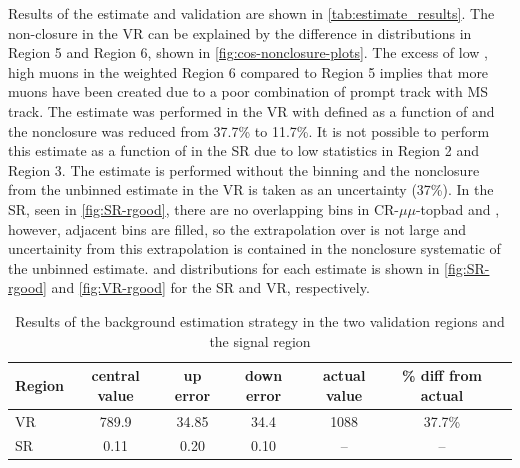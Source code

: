 Results of the estimate and validation are shown in \autoref{tab:estimate_results}. The non-closure in the VR can be explained by the difference in \absdz distributions in Region 5 and Region 6, shown in \autoref{fig:cos-nonclosure-plots}. The excess of low \absdz, high \chiCB muons in the weighted Region 6 compared to Region 5 implies that more muons have been created due to a poor combination of prompt track with MS track. The estimate was performed in the VR with \rgood  defined as a function of \absdz and the nonclosure was reduced from 37.7\% to 11.7\%. It is not possible to perform this estimate as a function of \absdz in the SR due to low statistics in Region 2 and Region 3. The estimate is performed without the \absdz binning and the nonclosure from the unbinned estimate in the VR is taken as an uncertainty (37\%). In the SR, seen in \autoref{fig:SR-rgood}, there are no overlapping \absdz bins in CR-$\mu\mu$-topbad and \rgood, however, adjacent bins are filled, so the extrapolation over \absdz is not large and uncertainity from this extrapolation is contained in the nonclosure systematic of the unbinned estimate. \rgood and \absdz distributions for each estimate is shown in \autoref{fig:SR-rgood} and \autoref{fig:VR-rgood} for the SR and VR, respectively.

\begin{table}
\centering{}
\begin{tabular}{lcccccc}
Region & central value & up error & down error & actual value & \% diff from actual \\
\hline
VR        & 789.9  & 34.85 & 34.4 & 1088 & 37.7\%  \\
SR        & 0.11 & 0.20  & 0.10  & --   & --   \\
\hline
\end{tabular}
\caption{Results of the background estimation strategy in the two validation regions and the signal region}
\label{tab:estimate_results}
\end{table}

